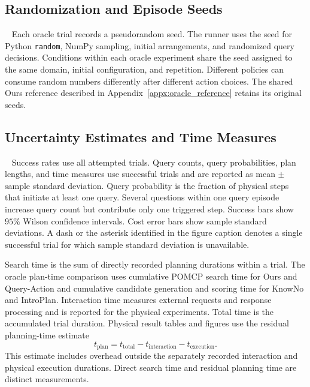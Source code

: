 \subsection{Randomization and Episode Seeds}~\label{appx:randomization}
Each oracle trial records a pseudorandom seed. The runner uses the seed for Python \texttt{random}, NumPy sampling, initial arrangements, and randomized query decisions. Conditions within each oracle experiment share the seed assigned to the same domain, initial configuration, and repetition. Different policies can consume random numbers differently after different action choices. The shared Ours reference described in Appendix~\ref{appx:oracle_reference} retains its original seeds.

\subsection{Uncertainty Estimates and Time Measures}~\label{appx:metric_details}
Success rates use all attempted trials. Query counts, query probabilities, plan lengths, and time measures use successful trials and are reported as mean $\pm$ sample standard deviation. Query probability is the fraction of physical steps that initiate at least one query. Several questions within one query episode increase query count but contribute only one triggered step. Success bars show $95\%$ Wilson confidence intervals. Cost error bars show sample standard deviations. A dash or the asterisk identified in the figure caption denotes a single successful trial for which sample standard deviation is unavailable.

Search time is the sum of directly recorded planning durations within a trial. The oracle plan-time comparison uses cumulative POMCP search time for Ours and Query-Action and cumulative candidate generation and scoring time for KnowNo and IntroPlan. Interaction time measures external requests and response processing and is reported for the physical experiments. Total time is the accumulated trial duration. Physical result tables and figures use the residual planning-time estimate
\[
t_{\mathrm{plan}}=t_{\mathrm{total}}-t_{\mathrm{interaction}}-t_{\mathrm{execution}}.
\]
This estimate includes overhead outside the separately recorded interaction and physical execution durations. Direct search time and residual planning time are distinct measurements.


